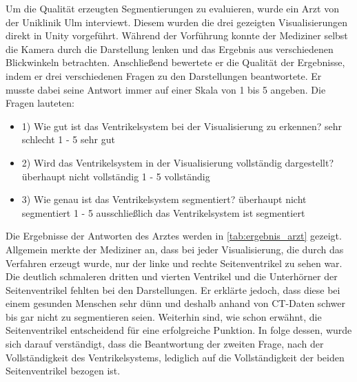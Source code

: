 Um die Qualität erzeugten Segmentierungen zu evaluieren, wurde ein Arzt von der Uniklinik Ulm interviewt. Diesem wurden die drei gezeigten Visualisierungen direkt in Unity vorgeführt. Während der Vorführung konnte der Mediziner selbst die Kamera durch die Darstellung lenken und das Ergebnis aus verschiedenen Blickwinkeln betrachten.
\newline
Anschließend bewertete er die Qualität der Ergebnisse, indem er drei verschiedenen Fragen zu den Darstellungen beantwortete. Er musste dabei seine Antwort immer auf einer Skala von 1 bis 5 angeben.
Die Fragen lauteten:
\begin{itemize}
	\item 1) Wie gut ist das Ventrikelsystem bei der Visualisierung zu erkennen? \newline sehr schlecht 1 - 5 sehr gut
	\item 2) Wird das Ventrikelsystem in der Visualisierung vollständig dargestellt? \newline überhaupt nicht vollständig 1 - 5 vollständig
	\item 3) Wie genau ist das Ventrikelsystem segmentiert? \newline überhaupt nicht segmentiert 1 - 5 ausschließlich das Ventrikelsystem ist segmentiert
\end{itemize}


Die Ergebnisse der Antworten des Arztes werden in \autoref{tab:ergebnis_arzt} gezeigt. Allgemein merkte der Mediziner an, dass bei jeder Visualisierung, die durch das Verfahren erzeugt wurde, nur der linke und rechte Seitenventrikel zu sehen war. Die deutlich schmaleren dritten und vierten Ventrikel und die Unterhörner der Seitenventrikel fehlten bei den Darstellungen. Er erklärte jedoch, dass diese bei einem gesunden Menschen sehr dünn und deshalb anhand von CT-Daten schwer bis gar nicht zu segmentieren seien. Weiterhin sind, wie schon erwähnt, die Seitenventrikel entscheidend für eine erfolgreiche Punktion.
\newline
In folge dessen, wurde sich darauf verständigt, dass die Beantwortung der zweiten Frage, nach der Vollständigkeit des Ventrikelsystems, lediglich auf die Vollständigkeit der beiden Seitenventrikel bezogen ist.

\begin{table}[h]
\centering
\tiny
{}
\caption{Ergebnisse des Interviews mit einem Arzt}
\label{tab:ergebnis_arzt}
\end{table}


